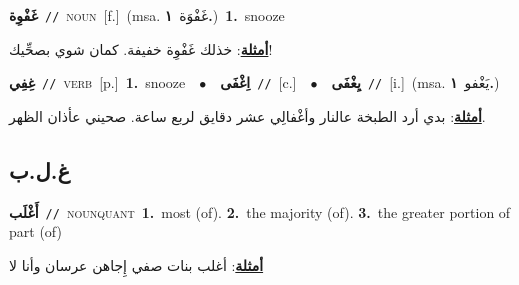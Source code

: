 \documentclass[10pt,a4paper,twoside]{article} %
\begin{document}
\begin{multicols}{2}
{\setlength\topsep{0pt}\textbf{\foreignlanguage{arabic}{غَفْوِة}}\ {\color{gray}\texttt{//}\color{black}}\ \textsc{noun}\ [f.]\ \color{gray}(msa. \foreignlanguage{arabic}{غَفْوَة}~\foreignlanguage{arabic}{\textbf{١.}})\color{black}\ \textbf{1.}~snooze\  \begin{flushright}\color{gray}\foreignlanguage{arabic}{\textbf{\underline{\foreignlanguage{arabic}{أمثلة}}}: خذلك غَفْوِة خفيفة. كمان شوي بصحِّيك!}\end{flushright}\color{black}} \vspace{2mm}

{\setlength\topsep{0pt}\textbf{\foreignlanguage{arabic}{غِفِي}}\ {\color{gray}\texttt{//}\color{black}}\ \textsc{verb}\ [p.]\ \textbf{1.}~snooze\ \ $\bullet$\ \ \setlength\topsep{0pt}\textbf{\foreignlanguage{arabic}{اِغْفَى}}\ {\color{gray}\texttt{//}\color{black}}\ [c.]\ \ $\bullet$\ \ \setlength\topsep{0pt}\textbf{\foreignlanguage{arabic}{يِغْفَى}}\ {\color{gray}\texttt{//}\color{black}}\ [i.]\ \color{gray}(msa. \foreignlanguage{arabic}{يَغْفو}~\foreignlanguage{arabic}{\textbf{١.}})\color{black}\  \begin{flushright}\color{gray}\foreignlanguage{arabic}{\textbf{\underline{\foreignlanguage{arabic}{أمثلة}}}: بدي أرد الطبخة عالنار وأغْفالِي عشر دقايق لربع ساعة. صحيني عأذان الظهر.}\end{flushright}\color{black}} \vspace{2mm}

\vspace{-3mm}
\subsection*{\color{blue}\foreignlanguage{arabic}{غ.ل.ب}\color{blue}{}} 

{\setlength\topsep{0pt}\textbf{\foreignlanguage{arabic}{أَغْلَب}}\ {\color{gray}\texttt{//}\color{black}}\ \textsc{noun\textunderscore quant}\ \textbf{1.}~most (of).  \textbf{2.}~the majority (of).  \textbf{3.}~the greater portion of part (of)\  \begin{flushright}\color{gray}\foreignlanguage{arabic}{\textbf{\underline{\foreignlanguage{arabic}{أمثلة}}}: أغلب بنات صفي إِجاهن عرسان وأنا لا}\end{flushright}\color{black}} \vspace{2mm}


\end{multicols}
\end{document}
